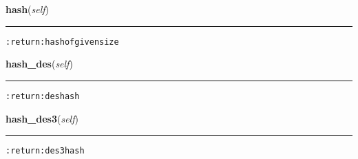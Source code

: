     \vspace{0.5ex}

\hspace{.8\funcindent}\begin{boxedminipage}{\funcwidth}

    \raggedright \textbf{hash}(\textit{self})

    \vspace{-1.5ex}

    \rule{\textwidth}{0.5\fboxrule}
\setlength{\parskip}{2ex}
\begin{alltt}

:return: hash of given size
\end{alltt}

\setlength{\parskip}{1ex}
    \end{boxedminipage}

    \label{hal:maths:crypt:DES:hash_des}

    \vspace{0.5ex}

\hspace{.8\funcindent}\begin{boxedminipage}{\funcwidth}

    \raggedright \textbf{hash\_des}(\textit{self})

    \vspace{-1.5ex}

    \rule{\textwidth}{0.5\fboxrule}
\setlength{\parskip}{2ex}
\begin{alltt}

:return: des hash
\end{alltt}

\setlength{\parskip}{1ex}
    \end{boxedminipage}

    \label{hal:maths:crypt:DES:hash_des3}

    \vspace{0.5ex}

\hspace{.8\funcindent}\begin{boxedminipage}{\funcwidth}

    \raggedright \textbf{hash\_des3}(\textit{self})

    \vspace{-1.5ex}

    \rule{\textwidth}{0.5\fboxrule}
\setlength{\parskip}{2ex}
\begin{alltt}

:return: des3 hash
\end{alltt}

\setlength{\parskip}{1ex}
    \end{boxedminipage}


